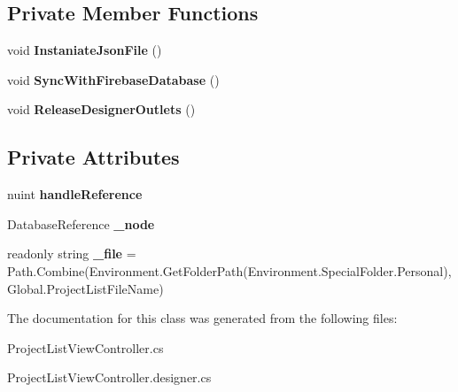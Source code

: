 \subsection*{Private Member Functions}
\begin{DoxyCompactItemize}
\item 
\mbox{\label{class_ramboell_1_1i_o_s_1_1_project_list_view_controller_a037a0f546ea6fcf14af695751464b781}} 
void {\bfseries Instaniate\+Json\+File} ()
\item 
\mbox{\label{class_ramboell_1_1i_o_s_1_1_project_list_view_controller_aea12a1a3796492b53f800400f1ea92be}} 
void {\bfseries Sync\+With\+Firebase\+Database} ()
\item 
\mbox{\label{class_ramboell_1_1i_o_s_1_1_project_list_view_controller_a8cfe3c5a97cb35ed9fc0f669441db8e1}} 
void {\bfseries Release\+Designer\+Outlets} ()
\end{DoxyCompactItemize}
\subsection*{Private Attributes}
\begin{DoxyCompactItemize}
\item 
\mbox{\label{class_ramboell_1_1i_o_s_1_1_project_list_view_controller_a72fcd6ac2788386867749cbf040663e8}} 
nuint {\bfseries handle\+Reference}
\item 
\mbox{\label{class_ramboell_1_1i_o_s_1_1_project_list_view_controller_a4ad3f8af1c55c3a53c030a4a8933595f}} 
Database\+Reference {\bfseries \+\_\+node}
\item 
\mbox{\label{class_ramboell_1_1i_o_s_1_1_project_list_view_controller_aebf9f6d35e9d5542080a81597994aa79}} 
readonly string {\bfseries \+\_\+file} = Path.\+Combine(Environment.\+Get\+Folder\+Path(Environment.\+Special\+Folder.\+Personal), Global.\+Project\+List\+File\+Name)
\end{DoxyCompactItemize}


The documentation for this class was generated from the following files\+:\begin{DoxyCompactItemize}
\item 
Project\+List\+View\+Controller.\+cs\item 
Project\+List\+View\+Controller.\+designer.\+cs\end{DoxyCompactItemize}
